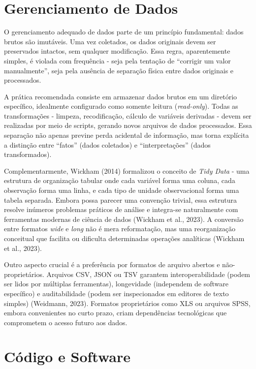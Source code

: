 \documentclass[
  a4paper,
]{book}
\begin{document}
\section{Gerenciamento de Dados}\label{gerenciamento-de-dados}

O gerenciamento adequado de dados parte de um princípio fundamental:
dados brutos são imutáveis. Uma vez coletados, os dados originais devem
ser preservados intactos, sem qualquer modificação. Essa regra,
aparentemente simples, é violada com frequência - seja pela tentação de
``corrigir um valor manualmente'', seja pela ausência de separação
física entre dados originais e processados.

A prática recomendada consiste em armazenar dados brutos em um diretório
específico, idealmente configurado como somente leitura
(\emph{read-only}). Todas as transformações - limpeza, recodificação,
cálculo de variáveis derivadas - devem ser realizadas por meio de
scripts, gerando novos arquivos de dados processados. Essa separação não
apenas previne perda acidental de informação, mas torna explícita a
distinção entre ``fatos'' (dados coletados) e ``interpretações'' (dados
transformados).

Complementarmente, Wickham (2014) formalizou o conceito de \emph{Tidy
Data} - uma estrutura de organização tabular onde cada variável forma
uma coluna, cada observação forma uma linha, e cada tipo de unidade
observacional forma uma tabela separada. Embora possa parecer uma
convenção trivial, essa estrutura resolve inúmeros problemas práticos de
análise e integra-se naturalmente com ferramentas modernas de ciência de
dados (Wickham et al., 2023). A conversão entre formatos \emph{wide} e
\emph{long} não é mera reformatação, mas uma reorganização conceitual
que facilita ou dificulta determinadas operações analíticas (Wickham et
al., 2023).

Outro aspecto crucial é a preferência por formatos de arquivo abertos e
não-proprietários. Arquivos CSV, JSON ou TSV garantem interoperabilidade
(podem ser lidos por múltiplas ferramentas), longevidade (independem de
software específico) e auditabilidade (podem ser inspecionados em
editores de texto simples) (Weidmann, 2023). Formatos proprietários como
XLS ou arquivos SPSS, embora convenientes no curto prazo, criam
dependências tecnológicas que comprometem o acesso futuro aos dados.

\section{Código e Software}\label{cuxf3digo-e-software}
\end{document}
